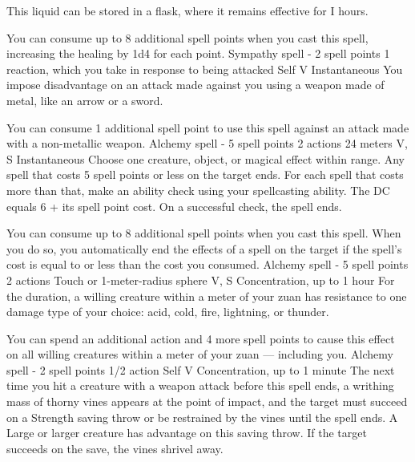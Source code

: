     This liquid can be stored in a flask, where it remains effective for I hours.

    You can consume up to 8 additional spell points when you cast this spell, increasing the healing by 1d4 for each point.
    {Sympathy spell - 2 spell points}
    {1 reaction, which you take in response to being attacked}
    {Self}
    {V}
    {Instantaneous}
    You impose disadvantage on an attack made against you using a weapon made of metal, like an arrow or a sword.

    You can consume 1 additional spell point to use this spell against an attack made with a non-metallic weapon.
    {Alchemy spell - 5 spell points}
    {2 actions}
    {24 meters}
    {V, S}
    {Instantaneous}
    Choose one creature, object, or magical effect within range.
    Any spell that costs 5 spell points or less on the target ends.
    For each spell that costs more than that, make an ability check using your spellcasting ability.
    The DC equals 6 + its spell point cost.
    On a successful check, the spell ends.

    You can consume up to 8 additional spell points when you cast this spell.
    When you do so, you automatically end the effects of a spell on the target if the spell's cost is equal to or less than the cost you consumed.
    {Alchemy spell - 5 spell points}
    {2 actions}
    {Touch or 1-meter-radius sphere}
    {V, S}
    {Concentration, up to 1 hour}
    For the duration, a willing creature within a meter of your zuan has resistance to one damage type of your choice: acid, cold, fire, lightning, or thunder.

    You can spend an additional action and 4 more spell points to cause this effect on all willing creatures within a meter of your zuan --- including you.
    {Alchemy spell - 2 spell points}
    {1/2 action}
    {Self}
    {V}
    {Concentration, up to 1 minute}
    The next time you hit a creature with a weapon attack before this spell ends, a writhing mass of thorny vines appears at the point of impact, and the target must succeed on a Strength saving throw or be restrained by the vines until the spell ends.
    A Large or larger creature has advantage on this saving throw.
    If the target succeeds on the save, the vines shrivel away.

